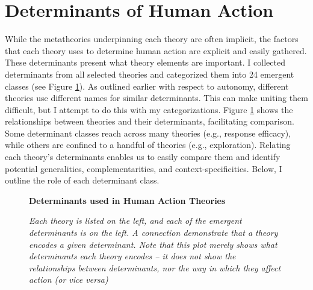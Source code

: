 \documentclass[12 pt]{article}
\begin{document}
\section{Determinants of Human Action}
While the metatheories underpinning each theory are often implicit, the factors that each theory uses to determine human action are explicit and easily gathered. These determinants present what theory elements are important. I collected determinants from all selected theories and categorized them into 24 emergent classes (see Figure \ref{fig:fact}).  As outlined earlier with respect to autonomy, different theories use different names for similar determinants. This can make uniting them difficult, but I attempt to do this with my categorizations. Figure \ref{fig:fact} shows the relationships between theories and their determinants, facilitating comparison. Some determinant classes reach across many theories (e.g., response efficacy), while others are confined to a handful of theories (e.g., exploration). Relating each theory's determinants enables us to easily compare them and identify potential generalities, complementarities, and context-specificities. Below, I outline the role of each determinant class.
\begin{figure}
	\centering
	\textbf{Determinants used in Human Action Theories}\par \medskip
	
	\caption{\textit{Each theory is listed on the left, and each of the emergent determinants is on the left. A connection demonstrate that a theory encodes a given determinant. Note that this plot merely shows what determinants each theory encodes -- it does not show the relationships between determinants, nor the way in which they affect action (or vice versa)}}
	\label{fig:fact}
\end{figure}
\end{document}
